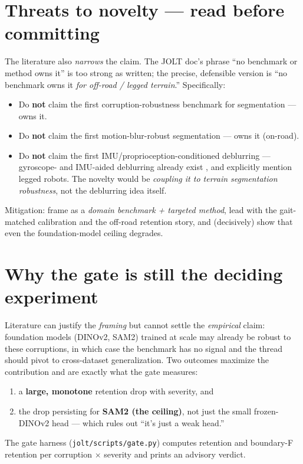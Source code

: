 \documentclass[11pt]{article}
\begin{document}
\section{Threats to novelty --- read before committing}
\label{sec:threats}
The literature also \emph{narrows} the claim. The JOLT doc's phrase ``no benchmark or
method owns it'' is too strong as written; the precise, defensible version is ``no
benchmark owns it \emph{for off-road / legged terrain}.'' Specifically:
\begin{itemize}[noitemsep]
  \item Do \textbf{not} claim the first corruption-robustness benchmark for
        segmentation --- \cite{kamann} owns it.
  \item Do \textbf{not} claim the first motion-blur-robust segmentation ---
        \cite{classcentric} owns it (on-road).
  \item Do \textbf{not} claim the first IMU/proprioception-conditioned deblurring ---
        gyroscope- and IMU-aided deblurring already exist \cite{mustaniemi,gyrodeblur,imumesh},
        and explicitly mention legged robots. The novelty would be \emph{coupling it
        to terrain segmentation robustness}, not the deblurring idea itself.
\end{itemize}
Mitigation: frame as a \emph{domain benchmark + targeted method}, lead with the
gait-matched calibration and the off-road retention story, and (decisively) show that
even the foundation-model ceiling degrades.

\section{Why the gate is still the deciding experiment}
\label{sec:gate}
Literature can justify the \emph{framing} but cannot settle the \emph{empirical}
claim: foundation models (DINOv2, SAM2) trained at scale may already be robust to
these corruptions, in which case the benchmark has no signal and the thread should
pivot to cross-dataset generalization. Two outcomes maximize the contribution and are
exactly what the gate measures:
\begin{enumerate}[noitemsep]
  \item a \textbf{large, monotone} retention drop with severity, and
  \item the drop persisting for \textbf{SAM2 (the ceiling)}, not just the small
        frozen-DINOv2 head --- which rules out ``it's just a weak head.''
\end{enumerate}
The gate harness (\texttt{jolt/scripts/gate.py}) computes retention and boundary-F
retention per corruption $\times$ severity and prints an advisory verdict.
\end{document}

